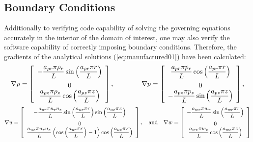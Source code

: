 \documentclass[10pt]{article}
\begin{document}
\subsection{Boundary Conditions}
Additionally to verifying code capability of solving the governing equations accurately in the interior of the domain of interest, one may also verify the software capability of correctly imposing boundary conditions. Therefore, the gradients of the  analytical solutions (\ref{eq:manufactured01}) have been calculated:
\begin{equation*}
\nabla  \rho= \left[ \begin{array}{c}
-\dfrac{  a_{\rho r}  \pi \rho_r}{L} \sin\left( \dfrac{ a_{\rho r}  \pi  r}{L}\right)\vspace{5pt} \\
 0\\
 \dfrac{  a_{\rho z}  \pi \rho_z}{L}  \cos\left( \dfrac{ a_{\rho z}  \pi  z}{L}\right)
\end{array} \right],
\qquad\quad\quad
\nabla p = \left[ \begin{array}{c}
  \dfrac{  a_{pr}  \pi p_r}{L} \cos\left( \dfrac{ a_{pr}  \pi  r}{L}\right)\vspace{5pt}\\
  0\\
- \dfrac{  a_{pz}  \pi p_z}{L} \sin\left( \dfrac{ a_{pz}  \pi  z}{L}\right)
\end{array} \right],
\end{equation*}
\begin{equation*}
\nabla u = \left[ \begin{array}{c}
  -\dfrac{  a_{ur}  \pi u_r u_z}{L} \sin\left( \dfrac{ a_{ur}  \pi  r}{L}\right)\sin\left( \dfrac{ a_{uz}  \pi  z}{L}\right)\vspace{5pt}\\
  0\\
   \dfrac{  a_{uz}  \pi u_r u_z}{L} \left( \cos\left( \dfrac{ a_{ur}  \pi  r}{L}\right) -1\right)\cos\left( \dfrac{ a_{uz}  \pi  z}{L}\right)
\end{array} \right],
\quad\mbox{and}\quad
\nabla w = \left[ \begin{array}{c}
-\dfrac{  a_{wr}  \pi  w_r}{L} \sin\left( \dfrac{ a_{wr}  \pi  r}{L}\right)\vspace{5pt}\\
 0\\
  \dfrac{  a_{wz}  \pi w_z}{L}  \cos\left( \dfrac{ a_{wz}  \pi  z}{L}\right)
\end{array} \right]
\end{equation*}
\end{document}
